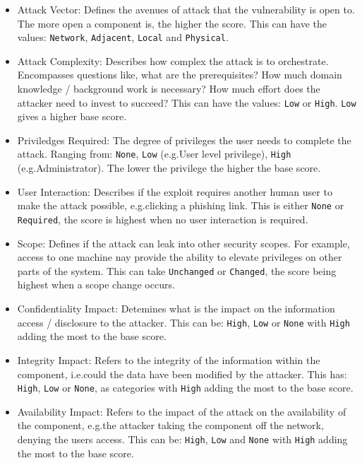 \begin{itemize}
	\item Attack Vector: Defines the avenues of attack that the vulnerability is open to. The more open a component is, the higher the score. This can have the values: \texttt{Network}, \texttt{Adjacent}, \texttt{Local} and \texttt{Physical}.

	\item Attack Complexity: Describes how complex the attack is to orchestrate. Encompasses questions like, what are the prerequisites? How much domain knowledge / background work is necessary? How much effort does the attacker need to invest to succeed? This can have the values: \texttt{Low} or \texttt{High}. \texttt{Low} gives a higher base score.

	\item Priviledges Required: The degree of privileges the user needs to complete the attack. Ranging from: \texttt{None}, \texttt{Low} (e.g.\@ User level privilege), \texttt{High} (e.g.\@ Administrator). The lower the privilege the higher the base score.

	\item User Interaction: Describes if the exploit requires another human user to make the attack possible, e.g.\@ clicking a phishing link. This is either \texttt{None} or \texttt{Required}, the score is highest when no user interaction is required.

	\item Scope: Defines if the attack can leak into other security scopes. For example, access to one machine nay provide the ability to elevate privileges on other parts of the system. This can take \texttt{Unchanged} or \texttt{Changed}, the score being highest when a scope change occurs.

	\item Confidentiality Impact: Detemines what is the impact on the information access / disclosure to the attacker. This can be: \texttt{High}, \texttt{Low} or \texttt{None} with \texttt{High} adding the most to the base score.

	\item Integrity Impact: Refers to the integrity of the information within the component, i.e.\@ could the data have been modified by the attacker. This has: \texttt{High}, \texttt{Low} or \texttt{None}, as categories with \texttt{High} adding the most to the base score.

	\item Availability Impact: Refers to the impact of the attack on the availability of the component, e.g.\@ the attacker taking the component off the network, denying the users access. This can be: \texttt{High}, \texttt{Low} and \texttt{None} with \texttt{High} adding the most to the base score.

\end{itemize}


